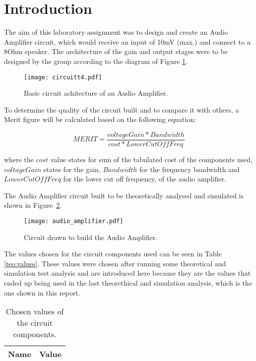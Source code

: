 \newpage
\section{Introduction}
\label{sec:introduction}


The aim of this laboratory assignment was to design and create an Audio Amplifier circuit, which would receive an input of 10mV (max.) and connect to a 8Ohm speaker. The architecture of the gain and output stages were to be designed by the group according to the diagram of Figure \ref{fig:t4}. 

\begin{figure}[h] \centering
	\texttt{[image: circuitt4.pdf]}
	\caption{Basic circuit achitecture of an Audio Amplifier.}
	\label{fig:t4}
\end{figure}


To determine the quality of the circuit built and to compare it with others, a Merit figure will be calculated based on the following equation: 

\begin {equation}
	MERIT = \frac{voltageGain*Bandwidth}{cost*LowerCutOffFreq}   	
\label{eq:merit}
\end{equation}

where the $cost$ value states for sum of the tabulated cost of the components used, $voltageGain$ states for the gain, $Bandwidth$ for the frequency bandwidth and $LowerCutOffFreq$ for the lower cut off frequency, of the audio amplifier.

The Audio Amplifier circuit built to be theoretically analysed and simulated is shown in Figure~\ref{fig:audio_amplifier}. 

\begin{figure}[H] \centering
	\texttt{[image: audio\_amplifier.pdf]}
	\caption{Circuit drawn to build the Audio Amplifier.}
	\label{fig:audio_amplifier}
\end{figure}

The values chosen for the circuit components used can be seen in Table \ref{teo:values}. These values were chosen after running some theoretical and simulation test analysis and are introduced here because they are the values that ended up being used in the last theorethical and simulation analysis, which is the one shown in this report.

\begin{table}[H]
	\centering
	\begin{tabular}{|l|r|}
		\hline    
		{\bf Name} & {\bf Value} \\ \hline
		
	\end{tabular}
	\caption{Chosen values of the circuit components.}
	\label{tab:values}
\end{table}

